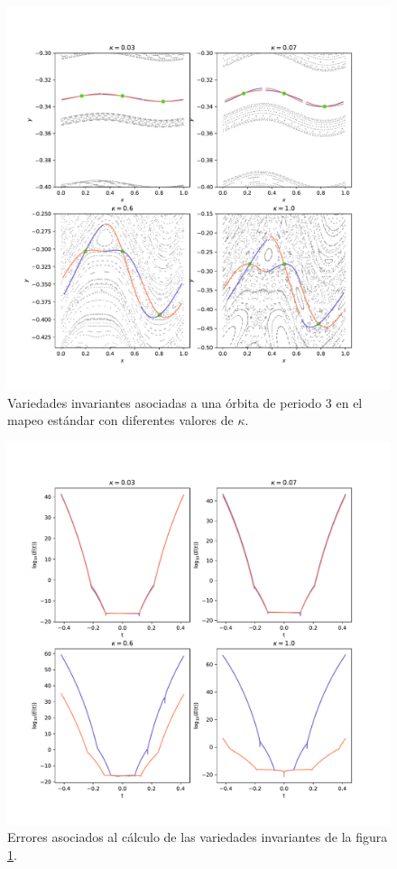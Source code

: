 \begin{figure}[H]
	\centering
	\includegraphics[scale=0.7]{variedadesestandarperiodo3}
	\caption{Variedades invariantes asociadas a una \'orbita de periodo 3 en el mapeo est\'andar con diferentes valores de $\kappa$.}
	\label{variedadesestandarperiodo3}
\end{figure}
\begin{figure}[H]
	\centering
	\includegraphics[scale=0.7]{erroresvariedadesestandarperiodo3}
	\caption{Errores asociados al c\'alculo de las variedades invariantes de la figura \ref{variedadesestandarperiodo3}. }
	\label{erroresvariedadesperiodo3}
\end{figure}

